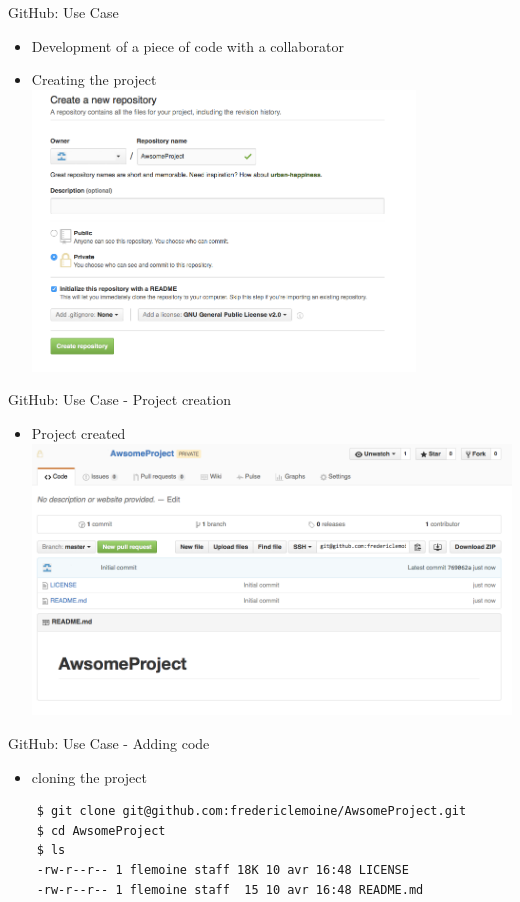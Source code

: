 \begin{frame}{GitHub: Use Case}
  \begin{itemize}
  \item Development of a piece of code with a collaborator
  \item Creating the project
  \includegraphics[width=0.8\textwidth]{images/hosting_services_use_case_1.png}
  \end{itemize}
\end{frame}

\begin{frame}{GitHub: Use Case - Project creation}
  \begin{itemize}
  \item Project created
    \includegraphics[width=\textwidth]{images/hosting_services_use_case_2.png}
  \end{itemize}
\end{frame}

\begin{frame}[fragile]{GitHub: Use Case - Adding code}
  \begin{itemize}
  \item cloning the project
  \end{itemize}
  \begin{lstlisting}
    $ git clone git@github.com:fredericlemoine/AwsomeProject.git
    $ cd AwsomeProject
    $ ls
    -rw-r--r-- 1 flemoine staff 18K 10 avr 16:48 LICENSE
    -rw-r--r-- 1 flemoine staff  15 10 avr 16:48 README.md
  \end{lstlisting}
\end{frame}

